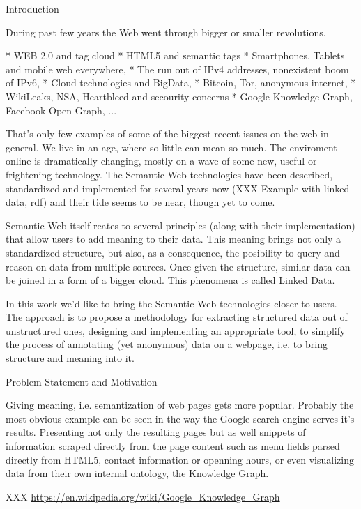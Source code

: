\chap Introduction

During past few years the Web went through bigger or smaller revolutions. 

\begitems
  * WEB 2.0 and tag cloud
  * HTML5 and semantic tags
  * Smartphones, Tablets and mobile web everywhere, 
  * The run out of IPv4 addresses, nonexistent boom of IPv6, 
  * Cloud technologies and BigData, 
  * Bitcoin, Tor, anonymous internet, 
  * WikiLeaks, NSA, Heartbleed and secourity concerns
  * Google Knowledge Graph, Facebook Open Graph, ...
\enditems

That's only few examples of some of the biggest recent issues on the web in
general. We live in an age, where so little can mean so much. The enviroment
online is dramatically changing, mostly on a wave of some new, useful or
frightening technology. The Semantic Web technologies have been described,
standardized and implemented for several years now  (XXX Example with linked
data, rdf) and their tide seems to be near, though yet to come.

Semantic Web itself reates to several principles (along with their
implementation) that allow users to add meaning to their data. This meaning
brings not only a standardized structure, but also, as a consequence, the
posibility to query and reason on data from multiple sources. Once given the
structure, similar data can be joined in a form of a bigger cloud. This
phenomena is called Linked Data. 

In this work we'd like to bring the Semantic Web technologies closer to users.
The approach is to propose a methodology for extracting structured data out of
unstructured ones, designing and implementing an appropriate tool, to simplify
the process of annotating (yet anonymous) data on a webpage, i.e. to bring
structure and meaning into it. 



\sec Problem Statement and Motivation

Giving meaning, i.e. semantization of web pages gets more popular. Probably the most
obvious example can be seen in the way the Google search engine serves it's
results. Presenting not only the resulting pages but as well snippets of
information scraped directly from the page content such as menu fields parsed
directly from HTML5, contact information or openning hours, or even visualizing
data from their own internal ontology, the Knowledge Graph. 

XXX \url{https://en.wikipedia.org/wiki/Google_Knowledge_Graph}

